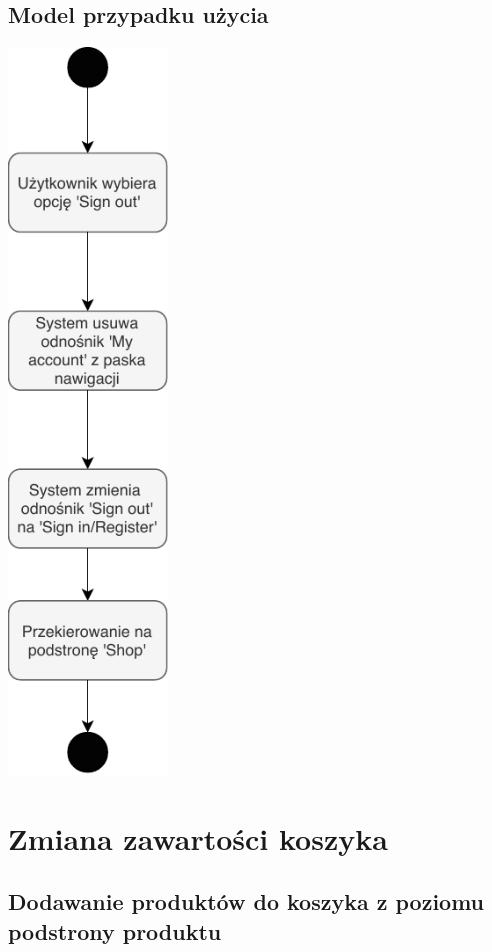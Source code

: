 \documentclass[12pt]{report}
\begin{document}
	\subsection{Model przypadku użycia}
	\begin{center}
		\includegraphics[width=120pt]{wylogowanie.pdf}
	\end{center}
	\newpage
		
	\section{Zmiana zawartości koszyka}
		\subsection{Dodawanie produktów do koszyka z poziomu podstrony produktu}
\end{document}
